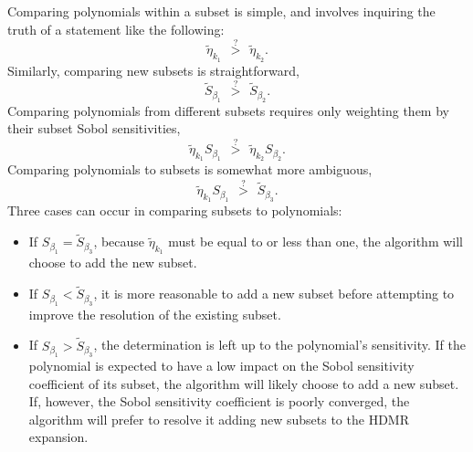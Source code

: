 Comparing polynomials within a subset is simple, and involves inquiring the truth of a statement like the
following:
\begin{equation}
  \tilde\eta_{k_1} \hspace{5pt}\stackrel{?}>\hspace{5pt} \tilde\eta_{k_2}.
\end{equation}
Similarly, comparing new subsets is straightforward,
\begin{equation}
  \tilde S_{\beta_1} \hspace{5pt}\stackrel{?}>\hspace{5pt} \tilde S_{\beta_2}.
\end{equation}
Comparing polynomials from different subsets requires only weighting them by their subset Sobol sensitivities,
\begin{equation}
  \tilde\eta_{k_1}S_{\beta_1} \hspace{5pt}\stackrel{?}>\hspace{5pt} \tilde\eta_{k_2}S_{\beta_2}.
\end{equation}
Comparing polynomials to subsets is somewhat more ambiguous,
\begin{equation}
  \tilde\eta_{k_1}S_{\beta_1} \hspace{5pt}\stackrel{?}>\hspace{5pt} \tilde S_{\beta_3}.
\end{equation}
Three cases can occur in comparing subsets to polynomials:
\begin{itemize}
  \item If $S_{\beta_1} = \tilde S_{\beta_3}$, because $\tilde\eta_{k_1}$ must be equal to or less than one,
    the algorithm will choose to add the new subset.
  \item If $S_{\beta_1} < \tilde S_{\beta_3}$, it is more reasonable to add a new subset before attempting to 
    improve the resolution of the existing subset.
  \item If $S_{\beta_1} > \tilde S_{\beta_3}$, the determination is left up to the polynomial's sensitivity.
    If the polynomial is expected to have a low impact on the Sobol sensitivity coefficient of its subset, the
    algorithm will likely choose to add a new subset.  If, however, the Sobol sensitivity coefficient is
    poorly converged, the algorithm will prefer to resolve it adding new subsets to the HDMR expansion.
\end{itemize}

